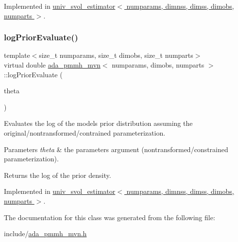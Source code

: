 Implemented in \hyperlink{classuniv__svol__estimator_aa73d0f9b96955c0b57fe59052e280008}{univ\+\_\+svol\+\_\+estimator$<$ numparams, dimnss, dimss, dimobs, numparts $>$}.

\mbox{\label{classada__pmmh__mvn_aff5af228ed4a7149287493e3ea6a5467}} 
\subsubsection{\texorpdfstring{log\+Prior\+Evaluate()}{logPriorEvaluate()}}
{\footnotesize\ttfamily template$<$size\+\_\+t numparams, size\+\_\+t dimobs, size\+\_\+t numparts$>$ \\
virtual double \hyperlink{classada__pmmh__mvn}{ada\+\_\+pmmh\+\_\+mvn}$<$ numparams, dimobs, numparts $>$\+::log\+Prior\+Evaluate (\begin{DoxyParamCaption}\item[{const \hyperlink{classparamPack}{param\+Pack} \&}]{theta }\end{DoxyParamCaption})\hspace{0.3cm}{\ttfamily [pure virtual]}}



Evaluates the log of the model\textquotesingle{}s prior distribution assuming the original/nontransformed/contrained parameterization. 


\begin{DoxyParams}{Parameters}
{\em theta} & the parameters argument (nontransformed/constrained parameterization). \\
\hline
\end{DoxyParams}
\begin{DoxyReturn}{Returns}
the log of the prior density. 
\end{DoxyReturn}


Implemented in \hyperlink{classuniv__svol__estimator_a6ee82e972206fa6ba1c8b4e359a7f6b7}{univ\+\_\+svol\+\_\+estimator$<$ numparams, dimnss, dimss, dimobs, numparts $>$}.



The documentation for this class was generated from the following file\+:\begin{DoxyCompactItemize}
\item 
include/\hyperlink{ada__pmmh__mvn_8h}{ada\+\_\+pmmh\+\_\+mvn.\+h}\end{DoxyCompactItemize}

